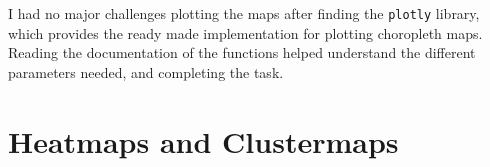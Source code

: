 \documentclass[11pt,a4paper,titlepage]{article}
\begin{document}
I had no major challenges plotting the maps after finding the \texttt{plotly} library, which provides the ready made implementation for plotting choropleth maps. Reading the documentation of the functions helped understand the different parameters needed, and completing the task.

\section{Heatmaps and Clustermaps}




\end{document}
